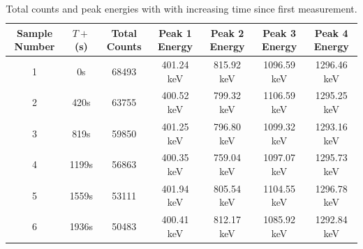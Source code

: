 \documentclass[a4paper,twocolumn]{IEEEtran}
\begin{document}
    \begin{table}[t]
        \centering
        \caption{Total counts and peak energies with with increasing time since first measurement.}
        \begin{tabular}{c c c c c c c}
            \toprule
            \textbf{Sample Number} & $T+$ \textbf{(s)} & \textbf{Total Counts} & \textbf{Peak 1 Energy} & \textbf{Peak 2 Energy} & \textbf{Peak 3 Energy} & \textbf{Peak 4 Energy} \\
            \midrule
            1 & 0s & 68493 & 401.24 keV &  815.92 keV & 1096.59 keV & 1296.46 keV \\
            2 & 420s & 63755 & 400.52 keV & 799.32 keV & 1106.59 keV & 1295.25 keV \\
            3 & 819s & 59850 & 401.25 keV & 796.80 keV & 1099.32 keV  & 1293.16 keV \\
            4 & 1199s & 56863 & 400.35 keV & 759.04 keV & 1097.07 keV & 1295.73 keV \\
            5 & 1559s & 53111 & 401.94 keV & 805.54 keV & 1104.55 keV & 1296.78 keV \\
            6 & 1936s & 50483 & 400.41 keV & 812.17 keV & 1085.92 keV & 1292.84 keV \\
            \bottomrule
        \end{tabular}
        \label{tab:counts_v_time}
    \end{table}
    
    
    \onecolumn
    \appendix
\end{document}
